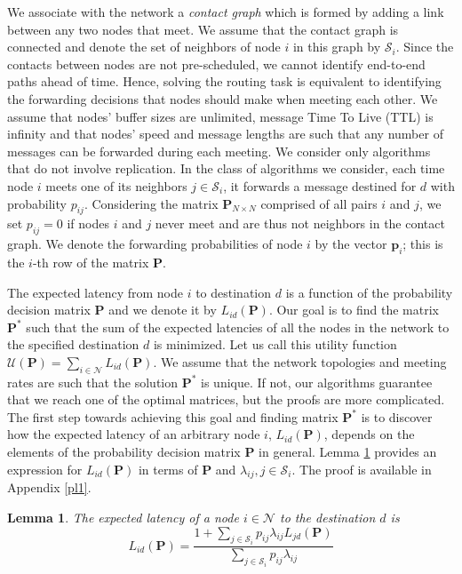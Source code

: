 \documentclass[journal,onecolumn,11pt]{IEEEtran}
\theoremstyle{plain}
\newtheorem{lemma}{Lemma}
\theoremstyle{definition}
\begin{document}
We associate with the network a {\em contact graph} which is formed by
adding a link between any two nodes that meet. We assume that the
contact graph is connected and denote the set of neighbors of node $i$
in this graph by $\mathcal{S}_i$. Since the contacts between nodes are
not pre-scheduled, we cannot identify end-to-end paths ahead of
time. Hence, solving the routing task is equivalent to identifying the
forwarding decisions that nodes should make when meeting each
other. We assume that nodes' buffer sizes are unlimited, message Time
To Live (TTL) is infinity and that nodes' speed and message lengths
are such that any number of messages can be forwarded during each
meeting.  We consider only algorithms that do not involve
replication. In the class of algorithms we consider, each time node
$i$ meets one of its neighbors $j \in \mathcal{S}_i$, it forwards a
message destined for $d$ with probability $p_{ij}$. Considering the
matrix $\mathbf{P}_{N \times N}$ comprised of all pairs $i$ and $j$,
we set $p_{ij}=0$ if nodes $i$ and $j$ never meet and are thus not
neighbors in the contact graph. We denote the forwarding probabilities
of node $i$ by the vector $\mathbf{p}_i$; this is the $i$-th row of
the matrix $\mathbf{P}$.

The expected latency from node $i$ to destination $d$ is a function of
the probability decision matrix $\mathbf{P}$ and we denote it by
$L_{id}(\mathbf{P})$. Our goal is to find the matrix $\mathbf{P}^*$
such that the sum of the expected latencies of all the nodes in the
network to the specified destination $d$ is minimized. Let us call
this utility function $\mathcal{U}(\mathbf{P}) = \sum_{i\in\mathcal{N}} L_{id}(\mathbf{P})$. We assume that the network topologies and
meeting rates are such that the solution $\mathbf{P}^*$ is unique. If
not, our algorithms guarantee that we reach one of the optimal
matrices, but the proofs are more complicated.
The first step towards achieving this goal and finding matrix $\mathbf{P}^*$ is to discover how the expected latency of an arbitrary node $i$, $L_{id}(\mathbf{P})$, depends on the elements of the probability decision matrix $\mathbf{P}$ in general. Lemma \ref{Lid} provides an expression for $L_{id}(\mathbf{P})$ in
terms of $\mathbf{P}$ and $\lambda_{ij}, j \in \mathcal{S}_i$. The proof is available in Appendix \ref{pl1}.


\begin{lemma} \label{Lid}
The expected latency of a node $i \in \mathcal{N}$ to the destination $d$ is
\begin{equation}\label{lem1}
L_{id}(\mathbf{P})= \frac{1+\sum_{j \in \mathcal{S}_i}p_{ij}\lambda_{ij}L_{jd}(\mathbf{P})}{\sum_{j \in \mathcal{S}_i}p_{ij}\lambda_{ij}}
\end{equation}
\end{lemma}
\end{document}
